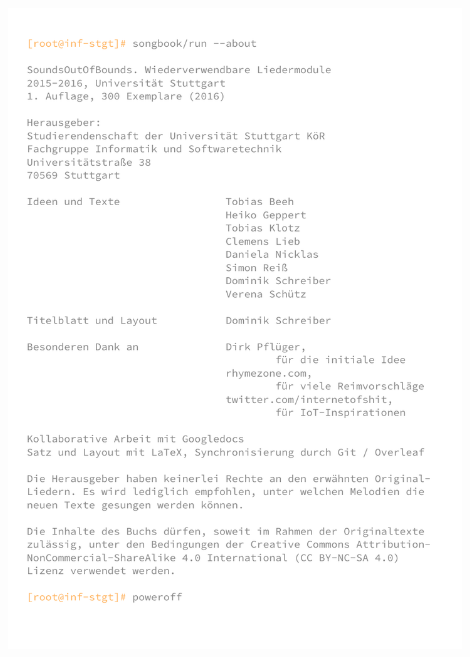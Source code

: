 \documentclass[11pt,a5paper]{article}
\begin{document}











\vspace*{1.5cm}

\hfill\includegraphics[width=12cm]{hacker-cover-back.pdf}\hspace*{\fill}

\thispagestyle{empty}
	
\end{document}
